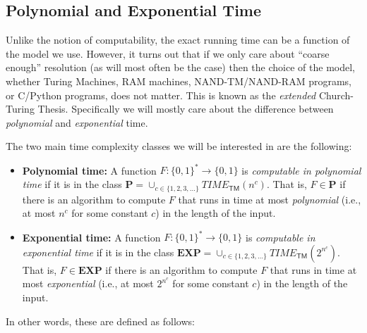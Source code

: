 \subsection{Polynomial and Exponential
Time}\label{Polynomial-and-Exponentia}

Unlike the notion of computability, the exact running time can be a
function of the model we use. However, it turns out that if we only care
about ``coarse enough'' resolution (as will most often be the case) then
the choice of the model, whether Turing Machines, RAM machines,
NAND-TM/NAND-RAM programs, or C/Python programs, does not matter. This
is known as the \emph{extended} Church-Turing Thesis. Specifically we
will mostly care about the difference between \emph{polynomial} and
\emph{exponential} time.

The two main time complexity classes we will be interested in are the
following:

\begin{itemize}
\item
  \textbf{Polynomial time:} A function
  \(F:\{0,1\}^* \rightarrow \{0,1\}\) is \emph{computable in polynomial
  time} if it is in the class
  \(\mathbf{P} = \cup_{c\in \{1,2,3,\ldots \}} \ensuremath{\mathit{TIME}}_{\mathsf{TM}}(n^c)\).
  That is, \(F\in \mathbf{P}\) if there is an algorithm to compute \(F\)
  that runs in time at most \emph{polynomial} (i.e., at most \(n^c\) for
  some constant \(c\)) in the length of the input.
\item
  \textbf{Exponential time:} A function
  \(F:\{0,1\}^* \rightarrow \{0,1\}\) is \emph{computable in exponential
  time} if it is in the class
  \(\mathbf{EXP} = \cup_{c\in \{1,2,3,\ldots \}} \ensuremath{\mathit{TIME}}_{\mathsf{TM}}(2^{n^c})\).
  That is, \(F\in \mathbf{EXP}\) if there is an algorithm to compute
  \(F\) that runs in time at most \emph{exponential} (i.e., at most
  \(2^{n^c}\) for some constant \(c\)) in the length of the input.
\end{itemize}

In other words, these are defined as follows:

\hypertarget{PandEXPdef}{}

